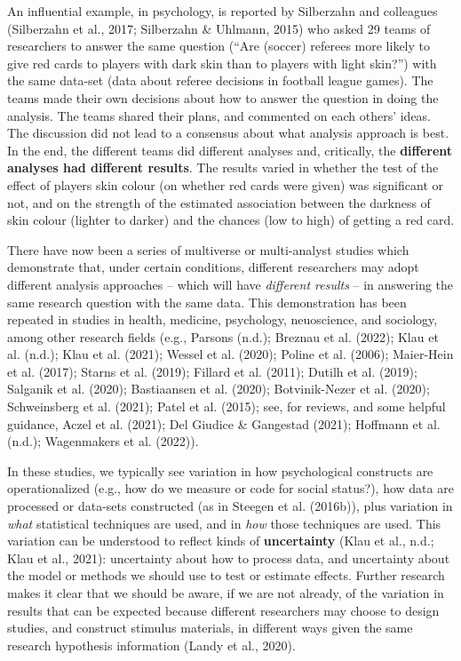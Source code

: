 \documentclass[
  letterpaper,
  DIV=11,
  numbers=noendperiod]{scrreprt}
\begin{document}
An influential example, in psychology, is reported by Silberzahn and
colleagues (Silberzahn et al., 2017; Silberzahn \& Uhlmann, 2015) who
asked 29 teams of researchers to answer the same question (``Are
(soccer) referees more likely to give red cards to players with dark
skin than to players with light skin?'') with the same data-set (data
about referee decisions in football league games). The teams made their
own decisions about how to answer the question in doing the analysis.
The teams shared their plans, and commented on each others' ideas. The
discussion did not lead to a consensus about what analysis approach is
best. In the end, the different teams did different analyses and,
critically, the \textbf{different analyses had different results}. The
results varied in whether the test of the effect of players skin colour
(on whether red cards were given) was significant or not, and on the
strength of the estimated association between the darkness of skin
colour (lighter to darker) and the chances (low to high) of getting a
red card.

There have now been a series of multiverse or multi-analyst studies
which demonstrate that, under certain conditions, different researchers
may adopt different analysis approaches -- which will have
\emph{different results} -- in answering the same research question with
the same data. This demonstration has been repeated in studies in
health, medicine, psychology, neuoscience, and sociology, among other
research fields (e.g., Parsons (n.d.); Breznau et al. (2022); Klau et
al. (n.d.); Klau et al. (2021); Wessel et al. (2020); Poline et al.
(2006); Maier-Hein et al. (2017); Starns et al. (2019); Fillard et al.
(2011); Dutilh et al. (2019); Salganik et al. (2020); Bastiaansen et al.
(2020); Botvinik-Nezer et al. (2020); Schweinsberg et al. (2021); Patel
et al. (2015); see, for reviews, and some helpful guidance, Aczel et al.
(2021); Del Giudice \& Gangestad (2021); Hoffmann et al. (n.d.);
Wagenmakers et al. (2022)).

In these studies, we typically see variation in how psychological
constructs are operationalized (e.g., how do we measure or code for
social status?), how data are processed or data-sets constructed (as in
Steegen et al. (2016b)), plus variation in \emph{what} statistical
techniques are used, and in \emph{how} those techniques are used. This
variation can be understood to reflect kinds of \textbf{uncertainty}
(Klau et al., n.d.; Klau et al., 2021): uncertainty about how to process
data, and uncertainty about the model or methods we should use to test
or estimate effects. Further research makes it clear that we should be
aware, if we are not already, of the variation in results that can be
expected because different researchers may choose to design studies, and
construct stimulus materials, in different ways given the same research
hypothesis information (Landy et al., 2020).
\end{document}
